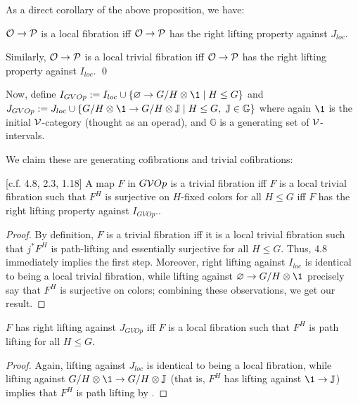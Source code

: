 \documentclass[psamsfonts,onesided,10pt,letterpaper]{amsart}%
\newcommand{\J}{\ensuremath{\mathbb{J}}}
\renewcommand{\P}{\ensuremath{\mathcal{P}}}
\begin{document}
As a direct corollary of the above proposition, we have:
\begin{corollary}
  $\O\to \P$ is a local fibration {\sc iff} $\O\to \P$ has the right lifting property against $J_{loc}$.
  
  Similarly, $\O\to \P$ is a local trivial fibration {\sc iff} $\O\to \P$ has the right lifting property against $I_{loc}$.  \qed
\end{corollary}

Now, define $I_{GVOp}:= I_{loc} \cup \sets{\varnothing \to G/H\otimes \1}{H\leq G}$ and $J_{GVOp} := J_{loc} \cup \sets{G/H\otimes \1 \to G/H\otimes \J}{H\leq G,\ \J\in\mathbb{G}}$ where again $\1$ is the initial $\mathcal V$-category (thought as an operad), and $\mathbb{G}$ is a generating set of $\mathcal V$-intervals. 

We claim these are generating cofibrations and trivial cofibrations:
\begin{lemma}
  \label{CAV_4.8}
  [c.f. \cite{Cav14} 4.8, \cite{BM13} 2.3, \cite{CM1} 1.18]
  A map $F$ in $G\mathcal V Op$ is a trivial fibration {\sc iff} $F$ is a local trivial fibration such that $F^H$ is surjective on $H$-fixed colors for all $H\leq G$ {\sc iff} $F$ has the right lifting property against $I_{GVOp}$.. 
\end{lemma}
\begin{proof}
  By definition, $F$ is a trivial fibration {\sc iff} it is a local trivial fibration such that $j^*F^H$ is path-lifting and essentially surjective for all $H\leq G$. Thus, \cite{Cav14} 4.8 immediately implies the first step. Moreover, right lifting against $I_{loc}$ is identical to being a local trivial fibration, while lifting against $\varnothing \to G/H\otimes \1$ precisely say that $F^H$ is surjective on colors; combining these observations, we get our result.
\end{proof}

\begin{lemma}
  $F$ has right lifting against $J_{GVOp}$ {\sc iff} $F$ is a local fibration such that $F^H$ is path lifting for all $H\leq G$.
\end{lemma}
\begin{proof}
  Again, lifting against $J_{loc}$ is identical to being a local fibration, while lifting against $G/H\otimes \1 \to G/H\otimes \J$ (that is, $F^H$ has lifting against $\1\to \J$) implies that $F^H$ is path lifting by \cite{Cav14}. 
\end{proof}
\end{document}
